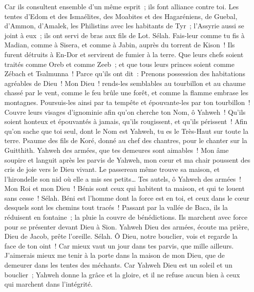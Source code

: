 \begin{multicols}{2}
Car ils consultent ensemble d'un même esprit~; ils font alliance contre toi.
Les tentes d'Edom et des Ismaélites, des Moabites et des Hagaréniens,
de Guebal, d'Ammon, d'Amalek, les Philistins avec les habitants de Tyr~;
l'Assyrie aussi se joint à eux~; ils ont servi de bras aux fils de Lot. Sélah.
Fais-leur comme tu fis à Madian, comme à Sisera, et comme à Jabin, auprès du torrent de Kison~!
Ils furent détruits à En-Dor et servirent de fumier à la terre.
Que leurs chefs soient traités comme Oreb et comme Zeeb~; et que tous leurs princes soient comme Zébach et Tsalmunna~!
Parce qu'ils ont dit~: Prenons possession des habitations agréables de Dieu~!
Mon Dieu~! rends-les semblables au tourbillon et au chaume chassé par le vent,
comme le feu brûle une forêt, et comme la flamme embrase les montagnes.
Poursuis-les ainsi par ta tempête et épouvante-les par ton tourbillon~!
Couvre leurs visages d'ignominie afin qu'on cherche ton Nom, ô Yahweh~!
Qu'ils soient honteux et épouvantés à jamais, qu'ils rougissent, et qu'ils périssent~!
Afin qu'on sache que toi seul, dont le Nom est Yahweh, tu es le Très-Haut sur toute la terre.
\VerseOne{}Psaume des fils de Koré, donné au chef des chantres, pour le chanter sur la Guitthith.
Yahweh des armées, que tes demeures sont aimables~!
Mon âme soupire et languit après les parvis de Yahweh, mon cœur et ma chair poussent des cris de joie vers le Dieu vivant.
Le passereau même trouve sa maison, et l'hirondelle son nid où elle a mis ses petits… Tes autels, ô Yahweh des armées~! Mon Roi et mon Dieu~!
Bénis sont ceux qui habitent ta maison, et qui te louent sans cesse~! Sélah.
Béni est l'homme dont la force est en toi, et ceux dans le cœur desquels sont les chemins tout tracés~!
Passant par la vallée de Baca, ils la réduisent en fontaine~; la pluie la couvre de bénédictions.
Ils marchent avec force pour se présenter devant Dieu à Sion.
Yahweh Dieu des armées, écoute ma prière, Dieu de Jacob, prête l'oreille. Sélah.
Ô Dieu, notre bouclier, vois et regarde la face de ton oint~!
Car mieux vaut un jour dans tes parvis, que mille ailleurs. J'aimerais mieux me tenir à la porte dans la maison de mon Dieu, que de demeurer dans les tentes des méchants.
Car Yahweh Dieu est un soleil et un bouclier~; Yahweh donne la grâce et la gloire, et il ne refuse aucun bien à ceux qui marchent dans l'intégrité.

\end{multicols}

